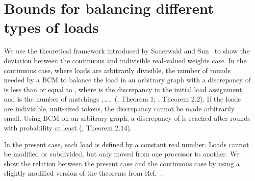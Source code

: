 \documentclass[12pt,psfig,a4]{article}
\theoremstyle{plain}
\begin{document}
\section{Bounds for balancing different types of loads}
\label{sec:bcm}
We use the theoretical framework introduced by Sauerwald and Sun~\cite{sauerwald2012tight} to show the deviation between the continuous and indivisible real-valued weights case. In the continuous case, where loads are arbitrarily divisible, the number of rounds needed by a BCM to balance the load in an arbitrary graph with a discrepancy of  is less than or equal to , where  is the discrepancy in the initial load assignment and  is the number of matchings ,\,\ldots ,\, (\cite{rabani1998local}, Theorem 1; \cite{sauerwald2012tight}, Theorem 2.2).
If the loads are indivisible, unit-sized tokens, the discrepancy cannot be made arbitrarily small. Using BCM on an arbitrary graph, a discrepancy of  is reached after  rounds with probability at least  (\cite{sauerwald2012tight}, Theorem 2.14).

In the present case, each load is defined by a constant real number. Loads cannot be modified or subdivided, but only moved from one processor to another. 
We show the relation between the present case and the continuous case by using a slightly modified version of the theorems from Ref.~\cite{sauerwald2012tight}.
\end{document}

